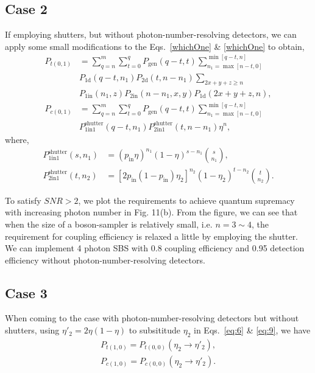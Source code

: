 \documentclass[aps,rmp,twocolumn,amsmath,amssymb,nofootinbib,superscriptaddress]{revtex4}
\begin{document}
\subsection{Case 2}

If employing shutters, but without photon-number-resolving detectors, we can apply some small modifications to the Eqs.~\ref{whichOne} \& \ref{whichOne} to obtain,
\begin{align} \label{eq:1011}
{P_{t(0,1)}} &= \sum_{q = n}^m {\sum_{t = 0}^q {{P_\mathrm{gen}}(q - t,t)\sum_{{n_1} = \max [n - t,0]}^{\min [q - t,n]} } } \nonumber \\
& {{P_\mathrm{1d}}(q - t,{n_1})}{P_\mathrm{2d}}(t,n - {n_1})\sum_{2x + y + z \ge n}  \nonumber \\
& {{P_\mathrm{1in}}({n_1},z){P_\mathrm{2in}}(n-{n_1},x,y)}{P_\mathrm{1d}}(2x + y + z,n), \nonumber \\
{P_{c(0,1)}} &= \sum_{q = n}^m {\sum_{t = 0}^q {{P_\mathrm{gen}}} } (q - t,t)\sum_{{n_1} = \max [n - t,0]}^{\min [q - t,n]} \nonumber \\
&{P_\mathrm{1in1}^\mathrm{shutter}(q - t,{n_1})} P_\mathrm{2in1}^\mathrm{shutter}(t,n - {n_1}){\eta^n},
\end{align}
where,
\begin{align} \label{eq:1213}
P_\mathrm{1in1}^\mathrm{shutter}(s,{n_1}) &= {({p_\mathrm{in}}\eta )^{{n_1}}}{(1 - \eta )^{s - {n_1}}}\binom{s}{n_1}, \nonumber \\
P_\mathrm{2in1}^\mathrm{shutter}(t,{n_2}) &= {[2{p_\mathrm{in}}(1 - {p_\mathrm{in}}){\eta_2}]^{{n_2}}} {(1 - {\eta _2})^{t - {n_2}}} \binom{t}{{n_2}}.
\end{align}

To satisfy \mbox{$SNR>2$}, we plot the requirements to achieve quantum supremacy with increasing photon number in Fig. 11(b). From the figure, we can see that when the size of a boson-sampler is relatively small, i.e. \mbox{$n = 3 \sim 4$}, the requirement for coupling efficiency is relaxed a little by employing the shutter. We can implement 4 photon SBS with 0.8 coupling efficiency and 0.95 detection efficiency without photon-number-resolving detectors.


\subsection{Case 3}

When coming to the case with photon-number-resolving detectors but without shutters, using \mbox{${\eta '_2}  = 2\eta (1 - \eta )$} to subsititude ${\eta _2}$ in Eqs.~\ref{eq:6} \& \ref{eq:9}, we have
\begin{align} \label{eq:1415}
{P_{t(1,0)}} = {P_{t(0,0)}}({\eta _2} \to {\eta '_2} ), \nonumber \\
{P_{c(1,0)}} = {P_{c(0,0)}}({\eta _2} \to {\eta '_2} ).
\end{align}
\end{document}
